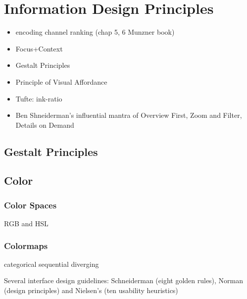 \section{Information Design Principles}
\begin{itemize}
	\item encoding channel ranking (chap 5, 6 Munzner book)
	\item Focus+Context
	\item Gestalt Principles
	\item Principle of Visual Affordance
	\item Tufte: ink-ratio
	\item Ben Shneiderman’s influential mantra of Overview First, Zoom and Filter, Details on Demand
\end{itemize}

\subsection{Gestalt Principles}
\label{sub:lr-gestalt}

\subsection{Color}

\subsubsection {Color Spaces}
RGB and HSL

\subsubsection {Colormaps}

categorical
sequential
diverging





Several interface design guidelines: Schneiderman (eight golden rules), Norman (design principles) and Nielsen’s (ten usability heuristics)



%
%


